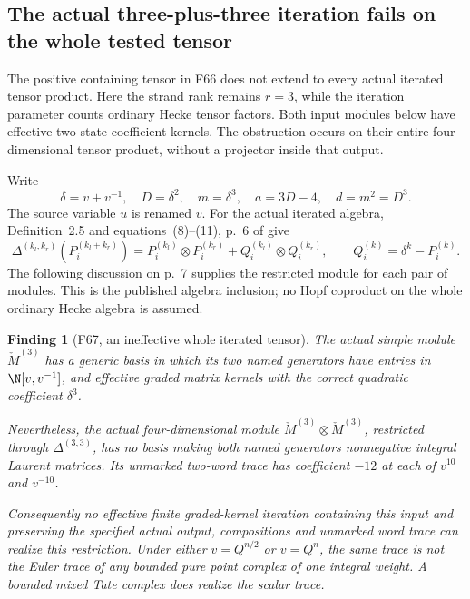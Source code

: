 \documentclass[11pt,a4paper]{article}
\newcommand{\fid}[1]{\textsf{#1}}\newcommand{\gate}[1]{\textsf{#1}}
\theoremstyle{named}\newtheorem{finding}{Finding}[section]
\theoremstyle{definition}\newtheorem{definition}[finding]{Definition}
\theoremstyle{remark}\newtheorem{remark}[finding]{Remark}
\begin{document}
\subsection{The actual three-plus-three iteration fails on the whole tested tensor}

The positive containing tensor in \fid{F66} does not
extend to every actual iterated tensor product.
Here the strand rank remains \(r=3\), while the
iteration parameter counts ordinary Hecke tensor
factors. Both input modules below have effective
two-state coefficient kernels. The obstruction
occurs on their entire four-dimensional tensor
product, without a projector inside that output.

Write
\[
 \delta=v+v^{-1},\quad D=\delta^2,\quad
 m=\delta^3,\quad a=3D-4,\quad d=m^2=D^3.
\]
The source variable \(u\) is renamed \(v\).
For the actual iterated algebra, Definition~2.5
and equations~(8)--(11), p.~6 of
\cite{BlasiakChebyshev} give
\begin{equation}\label{eq:sixTensorActualRestriction}
 \Delta^{(k_l,k_r)}(P_i^{(k_l+k_r)})
   =P_i^{(k_l)}\otimes P_i^{(k_r)}
       +Q_i^{(k_l)}\otimes Q_i^{(k_r)},
 \qquad Q_i^{(k)}=\delta^k-P_i^{(k)}.
\end{equation}
The following discussion on p.~7 supplies the
restricted module for each pair of modules.
This is the published algebra inclusion; no
Hopf coproduct on the whole ordinary Hecke
algebra is assumed.

\begin{finding}[\fid{F67}, an ineffective whole iterated tensor]
\label{f:sixTensorWholeObstruction}
The actual simple module \(\check M^{(3)}\) has
a generic basis in which its two named generators
have entries in \(\N[v,v^{-1}]\), and effective
graded matrix kernels with the correct quadratic
coefficient \(\delta^3\).

Nevertheless, the actual four-dimensional module
\(\check M^{(3)}\otimes\check M^{(3)}\), restricted
through \(\Delta^{(3,3)}\), has no basis making
both named generators nonnegative integral
Laurent matrices. Its unmarked two-word trace
has coefficient \(-12\) at each of \(v^{10}\)
and \(v^{-10}\).

Consequently no effective finite graded-kernel
iteration containing this input and preserving
the specified actual output, compositions and
unmarked word trace can realize this restriction.
Under either \(v=Q^{n/2}\) or \(v=Q^n\), the
same trace is not the Euler trace of any bounded
pure point complex of one integral weight.
A bounded mixed Tate complex does realize the
scalar trace.
\end{finding}
\end{document}
